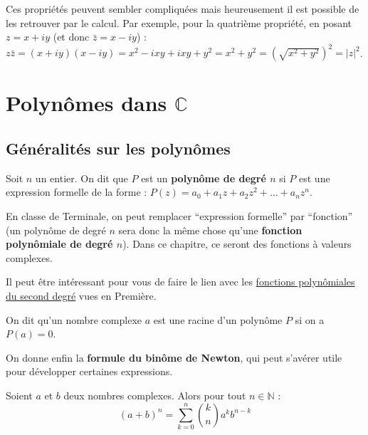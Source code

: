 	\begin{tip}
		Ces propriétés peuvent sembler compliquées mais heureusement il est possible de les retrouver par le calcul. Par exemple, pour la quatrième propriété, en posant $z = x+iy$ (et donc $\bar{z} = x-iy$) :
		\newpar
		$z\bar{z} = (x+iy)(x-iy) = x^2 - ixy + ixy + y^2 = x^2 + y^2 = \left(\sqrt{x^2 + y^2}\right)^2 = |z|^2$.
	\end{tip}

	\section{Polynômes dans \texorpdfstring{$\mathbb{C}$}{C}}

	\subsection{Généralités sur les polynômes}

	\begin{formula}[Définition]
		Soit $n$ un entier. On dit que $P$ est un \textbf{polynôme de degré $n$} si $P$ est une expression formelle de la forme : $P(z) = a_0 + a_1 z + a_2 z^2 + \dots + a_n z^n$.
	\end{formula}

	En classe de Terminale, on peut remplacer ``expression formelle'' par ``fonction'' (un polynôme de degré $n$ sera donc la même chose qu'une \textbf{fonction polynômiale de degré $n$}). Dans ce chapitre, ce seront des fonctions à valeurs complexes.

	\begin{tip}
		Il peut être intéressant pour vous de faire le lien avec les \href{https://bacomathiqu.es/cours/premiere/polynomes-second-degre/}{fonctions polynômiales du second degré} vues en Première.
	\end{tip}

	\begin{formula}
		On dit qu'un nombre complexe $a$ est une racine d'un polynôme $P$ si on a $P(a) = 0$.
	\end{formula}

	On donne enfin la \textbf{formule du binôme de Newton}, qui peut s'avérer utile pour développer certaines expressions.

	\begin{formula}
		Soient $a$ et $b$ deux nombres complexes. Alors pour tout $n \in \mathbb{N}$ :
		\[ (a + b)^n = \sum_{k = 0}^n \binom{k}{n} a^k b^{n-k} \]
	\end{formula}


